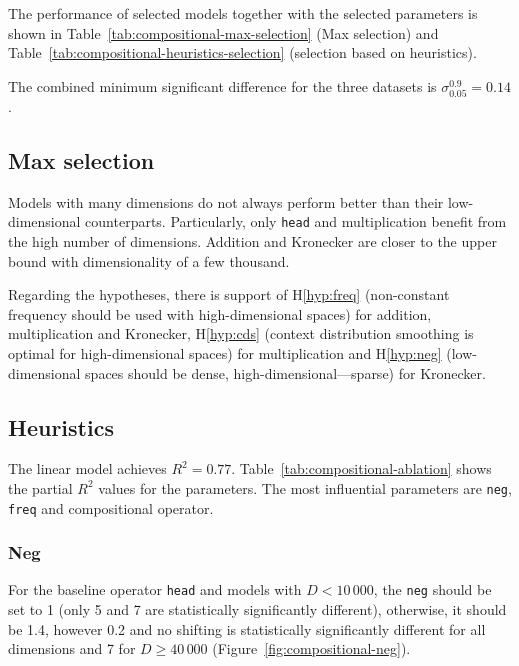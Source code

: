 The performance of selected models together with the selected parameters is shown in Table~\ref{tab:compositional-max-selection} (Max selection) and Table~\ref{tab:compositional-heuristics-selection} (selection based on heuristics).

The combined minimum significant difference for the three datasets is $\sigma^{0.9}_{0.05} = 0.14$.

\subsection{Max selection}
\label{sec:max-selection-compositional}

Models with many dimensions do not always perform better than their low-dimensional counterparts. Particularly, only \texttt{head} and multiplication benefit from the high number of dimensions. Addition and Kronecker are closer to the upper bound with dimensionality of a few thousand.

Regarding the hypotheses, there is support of H\ref{hyp:freq} (non-constant frequency should be used with high-dimensional spaces) for addition, multiplication and Kronecker, H\ref{hyp:cds} (context distribution smoothing is optimal for high-dimensional spaces) for multiplication and H\ref{hyp:neg} (low-dimensional spaces should be dense, high-dimensional---sparse) for Kronecker.

\subsection{Heuristics}
\label{sec:heuristics-compositional}



The linear model achieves  $R^2 = 0.77$. Table~\ref{tab:compositional-ablation} shows the partial $R^2$ values for the parameters. The most influential parameters are \texttt{neg}, \texttt{freq} and compositional operator.

\subsubsection{Neg}
\label{sec:neg-compositional}

For the baseline operator \texttt{head} and models with $D < 10\,000$, the \texttt{neg} should be set to 1 (only 5 and 7 are statistically significantly different), otherwise, it should be 1.4, however 0.2 and no shifting is statistically significantly different for all dimensions and 7 for $D \ge 40\,000$  (Figure~\ref{fig:compositional-neg}).

